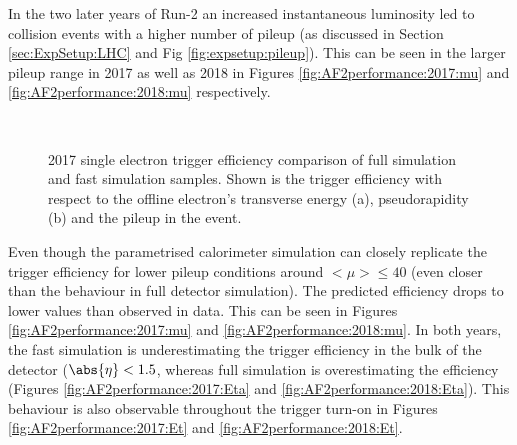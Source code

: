 
In the two later years of Run-2 an increased instantaneous luminosity led to collision events with a higher number of pileup (as discussed in Section \ref{sec:ExpSetup:LHC} and Fig \ref{fig:expsetup:pileup}).  This can be seen in the larger pileup range in 2017 as well as 2018 in Figures \ref{fig:AF2performance:2017:mu} and \ref{fig:AF2performance:2018:mu} respectively. 

\begin{figure}[h]\centering
  \\
  \caption{2017 single electron trigger efficiency comparison of full simulation and fast simulation samples. Shown is the trigger efficiency with respect to the offline electron's transverse energy (a),  pseudorapidity (b) and the pileup in the event.}
\end{figure}

Even though the parametrised calorimeter simulation can closely replicate the trigger efficiency for lower pileup conditions around $<\mu> \leq 40$ (even closer than the behaviour in full detector simulation). The predicted efficiency drops to lower values than observed in data.  This can be seen in Figures \ref{fig:AF2performance:2017:mu} and \ref{fig:AF2performance:2018:mu}.  In both years, the fast simulation is underestimating the trigger efficiency in the bulk of the detector ($\abs{\eta} < 1.5 $,  whereas full simulation is overestimating the efficiency (Figures \ref{fig:AF2performance:2017:Eta} and \ref{fig:AF2performance:2018:Eta}).  This behaviour is also observable throughout the trigger turn-on in Figures \ref{fig:AF2performance:2017:Et} and \ref{fig:AF2performance:2018:Et}. 

